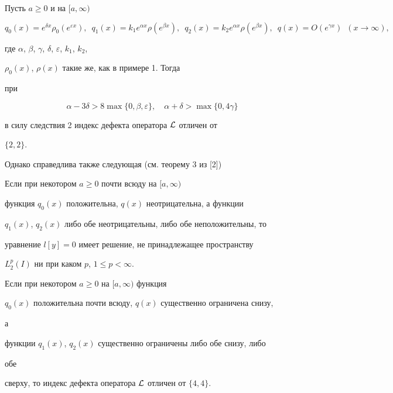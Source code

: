 \begin{exam} 


Пусть $a\ge0$ и на $[a,\infty)$ 


$$ 


q_0(x)=e^{\delta x}\rho_0(e^{\varepsilon x}), 


\ \; q_1(x)=k_1e^{\alpha x}\rho(e^{\beta x}), 


\ \; q_2(x)=k_2e^{\alpha x}\rho(e^{\beta x}), 


\ \; q(x)=O(e^{\gamma x})\ \; (x\to\infty), 


$$ 


где $\alpha$, $\beta$, $\gamma$, $\delta$, $\varepsilon$, $k_1$, $k_2$, 


$\rho_0(x)$, $\rho(x)$ такие же, как в примере 1. Тогда 


при 


\begin{equation} 


\alpha-3\delta>8\max\{0,\beta,\varepsilon\},\quad 


\alpha+\delta>\max\{0,4\gamma\} 


\end{equation} 


в силу следствия 2 индекс дефекта оператора $\cal L$ отличен от 


$\{2,2\}$. 


\end{exam} 


 


Однако справедлива также следующая (см. теорему 3 из [2]) 


 


\begin{thm} 


Если при некотором $a\ge0$ почти всюду на $[a,\infty)$ 


функция $q_0(x)$ положительна, $q(x)$ неотрицательна, а функции 


$q_1(x)$, $q_2(x)$ либо обе неотрицательны, либо обе неположительны, то 


уравнение $l[y]=0$ имеет решение, не принадлежащее пространству 


$L^p_2(I)$ ни при каком $p$, $1\le p<\infty$. 


\end{thm} 


 


\begin{cor} 


Если при некотором $a\ge0$ на $[a,\infty)$ функция 


$q_0(x)$ положительна почти всюду, $q(x)$ существенно ограничена снизу, 


а 


функции $q_1(x)$, $q_2(x)$ существенно ограничены либо обе снизу, либо 


обе 


сверху, то индекс дефекта оператора $\cal L$ отличен от $\{4,4\}$. 


\end{cor} 


